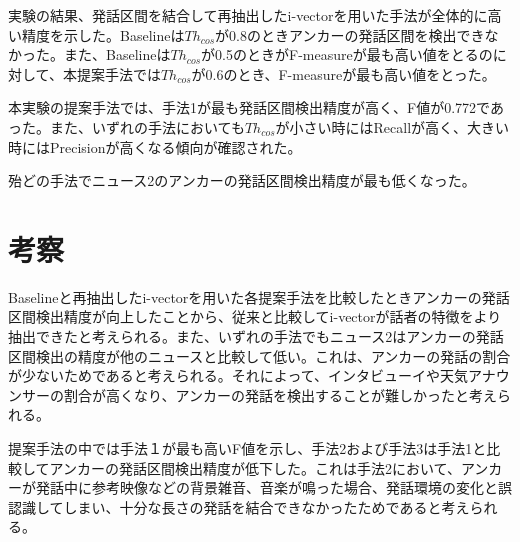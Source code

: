実験の結果、発話区間を結合して再抽出したi-vectorを用いた手法が全体的に高い精度を示した。Baselineは$Th_{cos}$が0.8のときアンカーの発話区間を検出できなかった。また、Baselineは$Th_{cos}$が0.5のときがF-measureが最も高い値をとるのに対して、本提案手法では$Th_{cos}$が0.6のとき、F-measureが最も高い値をとった。\par
本実験の提案手法では、手法1が最も発話区間検出精度が高く、F値が0.772であった。また、いずれの手法においても$Th_{cos}$が小さい時にはRecallが高く、大きい時にはPrecisionが高くなる傾向が確認された。\par
殆どの手法でニュース2のアンカーの発話区間検出精度が最も低くなった。

\section{考察}
Baselineと再抽出したi-vectorを用いた各提案手法を比較したときアンカーの発話区間検出精度が向上したことから、従来と比較してi-vectorが話者の特徴をより抽出できたと考えられる。また、いずれの手法でもニュース2はアンカーの発話区間検出の精度が他のニュースと比較して低い。これは、アンカーの発話の割合が少ないためであると考えられる。それによって、インタビューイや天気アナウンサーの割合が高くなり、アンカーの発話を検出することが難しかったと考えられる。\par
提案手法の中では手法１が最も高いF値を示し、手法2および手法3は手法1と比較してアンカーの発話区間検出精度が低下した。これは手法2において、アンカーが発話中に参考映像などの背景雑音、音楽が鳴った場合、発話環境の変化と誤認識してしまい、十分な長さの発話を結合できなかったためであると考えられる。
